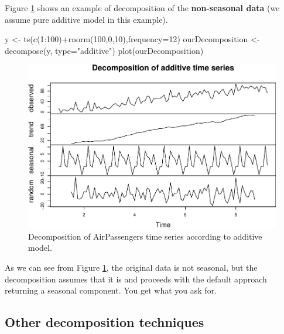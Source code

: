 \documentclass[
]{book}
\newenvironment{Shaded}{\begin{snugshade}}{\end{snugshade}}
\newcommand{\AttributeTok}[1]{\textcolor[rgb]{0.77,0.63,0.00}{#1}}
\newcommand{\DecValTok}[1]{\textcolor[rgb]{0.00,0.00,0.81}{#1}}
\newcommand{\FunctionTok}[1]{\textcolor[rgb]{0.00,0.00,0.00}{#1}}
\newcommand{\NormalTok}[1]{#1}
\newcommand{\OtherTok}[1]{\textcolor[rgb]{0.56,0.35,0.01}{#1}}
\newcommand{\SpecialCharTok}[1]{\textcolor[rgb]{0.00,0.00,0.00}{#1}}
\newcommand{\StringTok}[1]{\textcolor[rgb]{0.31,0.60,0.02}{#1}}
\theoremstyle{definition}
\theoremstyle{definition}
\theoremstyle{definition}
\theoremstyle{definition}
\theoremstyle{remark}
\begin{document}
Figure \ref{fig:decomposeRandomNoise} shows an example of decomposition of the \textbf{non-seasonal data} (we assume pure additive model in this example).

\begin{Shaded}
\begin{Highlighting}[]
\NormalTok{y }\OtherTok{\textless{}{-}} \FunctionTok{ts}\NormalTok{(}\FunctionTok{c}\NormalTok{(}\DecValTok{1}\SpecialCharTok{:}\DecValTok{100}\NormalTok{)}\SpecialCharTok{+}\FunctionTok{rnorm}\NormalTok{(}\DecValTok{100}\NormalTok{,}\DecValTok{0}\NormalTok{,}\DecValTok{10}\NormalTok{),}\AttributeTok{frequency=}\DecValTok{12}\NormalTok{)}
\NormalTok{ourDecomposition }\OtherTok{\textless{}{-}} \FunctionTok{decompose}\NormalTok{(y, }\AttributeTok{type=}\StringTok{"additive"}\NormalTok{)}
\FunctionTok{plot}\NormalTok{(ourDecomposition)}
\end{Highlighting}
\end{Shaded}

\begin{figure}
\centering
\includegraphics{Svetunkov--2022----ADAM_files/figure-latex/decomposeRandomNoise-1.pdf}
\caption{\label{fig:decomposeRandomNoise}Decomposition of AirPassengers time series according to additive model.}
\end{figure}

As we can see from Figure \ref{fig:decomposeRandomNoise}, the original data is not seasonal, but the decomposition assumes that it is and proceeds with the default approach returning a seasonal component. You get what you ask for.

\hypertarget{other-decomposition-techniques}{%
\subsection{Other decomposition techniques}\label{other-decomposition-techniques}}
\end{document}
